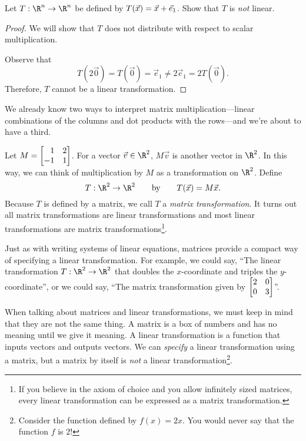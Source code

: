 \begin{example}
	Let $T:\R^n\to\R^n$ be defined by $T(\vec x)=\vec x+{\vec e_1}$. Show that
	$T$ is \emph{not} linear.

	\begin{proof}
		We will show that $T$ does not distribute with respect to scalar multiplication.

		Observe that
		\[
			T(2\vec 0)=T(\vec 0) = \vec e_1\neq 2\vec e_1=2T(\vec 0).
		\]
		Therefore, $T$ cannot be a linear transformation.
	\end{proof}
\end{example}



We already know two ways to interpret matrix multiplication---linear combinations of the columns
and dot products with the rows---and we're about to have a third.

Let $M=\mat{1&2\\-1&1}$. For a vector $\vec v\in \R^2$, $M\vec v$ is another vector in $\R^2$. In this way,
we can think of multiplication by $M$ as a transformation on $\R^2$. Define
\[
	T:\R^2\to\R^2\qquad\text{by}\qquad T(\vec x)=M\vec x.
\]
Because $T$ is defined by a matrix, we call $T$ a \emph{matrix transformation}.
It turns out all matrix transformations are linear transformations and most linear transformations
are matrix transformations\footnote{ If you believe in the axiom of choice and you allow infinitely sized matrices,
every linear transformation can be expressed as a matrix transformation.}. 

Just as with writing systems
of linear equations, matrices provide a compact way of specifying a linear transformation. For example, we could say,
``The linear transformation $T:\R^2\to\R^2$ that doubles the $x$-coordinate and triples the $y$-coordinate'', or
we could say, ``The matrix transformation given by $\mat{2&0\\0&3}$''.

\bigskip

When talking about matrices and linear transformations, we must keep in mind that they are not
the same thing. A matrix is a box of numbers and has no meaning until we give it meaning. 
A linear transformation is a function that inputs vectors and outputs vectors. We can \emph{specify} a linear transformation
using a matrix, but a matrix by itself is \emph{not} a linear transformation\footnote{ Consider the function defined
by $f(x)=2x$. You would never say that the function $f$ is $2$!}.

